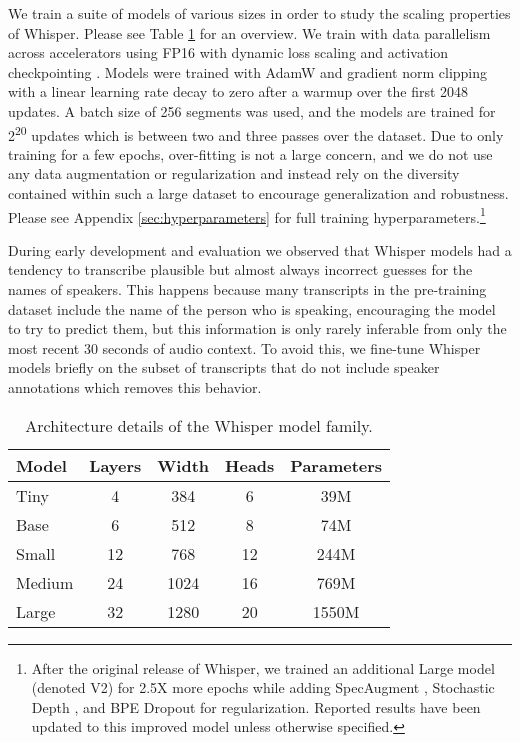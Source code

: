 \documentclass[nohyperref]{article}
\theoremstyle{plain}
\theoremstyle{definition}
\theoremstyle{remark}
\begin{document}
We train a suite of models of various sizes in order to study the scaling properties of Whisper. Please see Table \ref{tab:models} for an overview. We train with data parallelism across accelerators using FP16 with dynamic loss scaling and activation checkpointing \cite{griewank2000algorithm, chen2016training}. Models were trained with AdamW \cite{loshchilov2017decoupled} and gradient norm clipping \cite{pascanu2013difficulty} with a linear learning rate decay to zero after a warmup over the first 2048 updates. A batch size of 256 segments was used, and the models are trained for 2\textsuperscript{20} updates which is between two and three passes over the dataset. Due to only training for a few epochs, over-fitting is not a large concern, and we do not use any data augmentation or regularization and instead rely on the diversity contained within such a large dataset to encourage generalization and robustness. Please see Appendix \ref{sec:hyperparameters} for full training hyperparameters.\footnote{After the original release of Whisper, we trained an additional Large model (denoted V2) for 2.5X more epochs while adding SpecAugment \cite{park2019specaugment}, Stochastic Depth \cite{huang2016deep}, and BPE Dropout \cite{provilkov2019bpe} for regularization. Reported results have been updated to this improved model unless otherwise specified.}

During early development and evaluation we observed that Whisper models had a tendency to transcribe plausible but almost always incorrect guesses for the names of speakers. This happens because many transcripts in the pre-training dataset include the name of the person who is speaking, encouraging the model to try to predict them, but this information is only rarely inferable from only the most recent 30 seconds of audio context. To avoid this, we fine-tune Whisper models briefly on the subset of transcripts that do not include speaker annotations which removes this behavior.

\begin{table}[t]
\centering
\small
\begin{tabular}{l|cccc} \toprule
    Model & Layers & Width & Heads & Parameters \\
    \midrule
    Tiny & 4 & 384 & 6 & 39M \\
    Base & 6 & 512 & 8 & 74M \\
    Small & 12 & 768 & 12 & 244M \\
    Medium & 24 & 1024 & 16 & 769M \\
    Large & 32 & 1280 & 20 & 1550M \\
    \bottomrule
\end{tabular}
\caption{Architecture details of the Whisper model family.}\label{tab:models}
\end{table}
\end{document}
